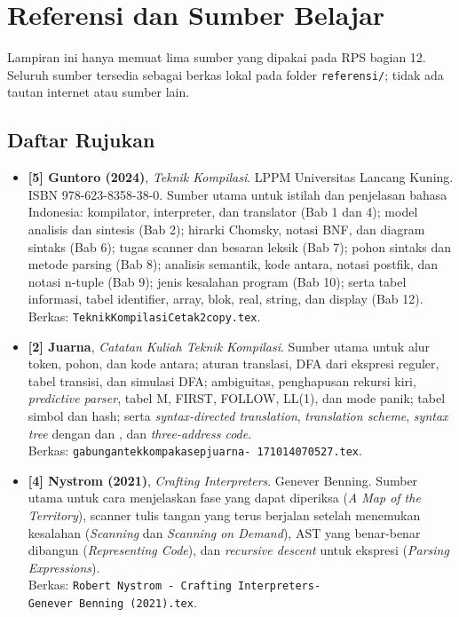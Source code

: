 \chapter{Referensi dan Sumber Belajar}
\label{app:referensi}

Lampiran ini hanya memuat lima sumber yang dipakai pada RPS bagian
12. Seluruh sumber tersedia sebagai berkas lokal pada folder
\texttt{referensi/}; tidak ada tautan internet atau sumber lain.

\section{Daftar Rujukan}
\label{app:referensi-rps}

\begin{itemize}[leftmargin=*]
  \item \textbf{[5] Guntoro (2024)}, \emph{Teknik Kompilasi}. LPPM
        Universitas Lancang Kuning. ISBN 978-623-8358-38-0. Sumber
        utama untuk istilah dan penjelasan bahasa Indonesia:
        kompilator, interpreter, dan translator (Bab 1 dan 4); model
        analisis dan sintesis (Bab 2); hirarki Chomsky, notasi BNF,
        dan diagram sintaks (Bab 6); tugas scanner dan besaran leksik
        (Bab 7); pohon sintaks dan metode parsing (Bab 8); analisis
        semantik, kode antara, notasi postfik, dan notasi n-tuple
        (Bab 9); jenis kesalahan program (Bab 10); serta tabel
        informasi, tabel identifier, array, blok, real, string, dan
        display (Bab 12).\\
        Berkas: \texttt{TeknikKompilasiCetak2copy.tex}.

  \item \textbf{[2] Juarna}, \emph{Catatan Kuliah Teknik Kompilasi}.
        Sumber utama untuk alur token, pohon, dan kode antara; aturan
        translasi, DFA dari ekspresi reguler, tabel transisi, dan
        simulasi DFA; ambiguitas, penghapusan rekursi kiri,
        \emph{predictive parser}, tabel M, FIRST, FOLLOW, LL(1), dan
        mode panik; tabel simbol dan hash; serta
        \emph{syntax-directed translation}, \emph{translation
        scheme}, \emph{syntax tree} dengan  dan
        , dan \emph{three-address code}.\\
        Berkas: \texttt{gabungantekkompakasepjuarna-\allowbreak
        171014070527.tex}.

  \item \textbf{[4] Nystrom (2021)}, \emph{Crafting Interpreters}.
        Genever Benning. Sumber utama untuk cara menjelaskan fase yang
        dapat diperiksa (\emph{A Map of the Territory}), scanner tulis
        tangan yang terus berjalan setelah menemukan kesalahan
        (\emph{Scanning} dan \emph{Scanning on Demand}), AST yang
        benar-benar dibangun (\emph{Representing Code}), dan
        \emph{recursive descent} untuk ekspresi (\emph{Parsing
        Expressions}).\\
        Berkas: \texttt{Robert Nystrom - Crafting Interpreters-}\\
        \texttt{Genever Benning (2021).tex}.


\end{itemize}
